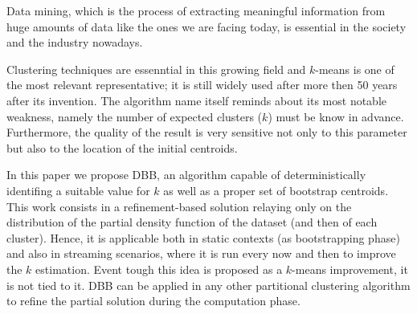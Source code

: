 Data mining, which is the process of extracting meaningful information from huge amounts of data
like the ones we are facing today,
is essential in the society and the industry nowadays.


Clustering techniques are essenntial in this growing field
and $k$-means is one of the most relevant representative; it is still widely used after more 
then 50 years after its invention.
The algorithm name itself reminds about its most notable weakness, namely the number of expected clusters 
($k$) must be know in advance. Furthermore, the quality of the result is very sensitive not only to this
parameter but also to the location of the initial centroids.


In this paper we propose DBB, an algorithm capable of
deterministically identifing a suitable value for $k$
as well as a proper set of bootstrap centroids.
This work consists in a refinement-based solution relaying only on the distribution
of the partial density function of the dataset (and then of each cluster).
Hence, it is applicable both in static contexts (as bootstrapping phase) and also in streaming scenarios,
where it is run every now and then to improve the $k$ estimation.
Event tough this idea is proposed as a $k$-means improvement,
it is not tied to it. DBB can be applied in any other partitional
clustering algorithm to refine the partial solution during the
computation phase.

